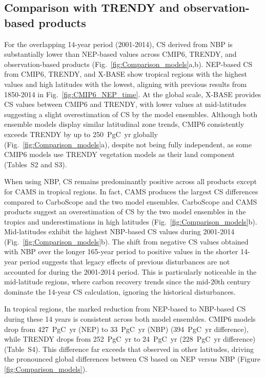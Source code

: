 \documentclass[9pt,twocolumn,twoside]{pnas-new}
\begin{document}
\subsection*{Comparison with TRENDY and observation-based products}
For the overlapping 14-year period (2001-2014), CS derived from NBP is substantially lower than NEP-based values across CMIP6, TRENDY, and observation-based products (Fig.~\ref{fig:Comparison_models}a,b). NEP-based CS from CMIP6, TRENDY, and X-BASE show tropical regions with the highest values and high latitudes with the lowest, aligning with previous results from 1850-2014 in Fig.~\ref{fig:CMIP6_NEP_time}. 
At the global scale, X-BASE provides CS values between CMIP6 and TRENDY, with lower values at mid-latitudes suggesting a slight overestimation of CS by the model ensembles. Although both ensemble models display similar latitudinal zone trends, CMIP6 consistently exceeds TRENDY by up to 250~PgC~yr globally (Fig.~\ref{fig:Comparison_models}a), despite not being fully independent, as some CMIP6 models use TRENDY vegetation models as their land component (Tables~S2 and S3).

When using NBP, CS remains predominantly positive across all products except for CAMS in tropical regions. In fact, CAMS produces the largest CS differences compared to CarboScope and the two model ensembles. CarboScope and CAMS products suggest an overestimation of CS by the two model ensembles in the tropics and underestimations in high latitudes (Fig.~\ref{fig:Comparison_models}b).
Mid-latitudes exhibit the highest NBP-based CS values during 2001-2014 (Fig.~\ref{fig:Comparison_models}b). The shift from negative CS values obtained with NBP over the longer 165-year period to positive values in the shorter 14-year period suggests that legacy effects of previous disturbances are not accounted for during the 2001-2014 period. This is particularly noticeable in the mid-latitude regions, where carbon recovery trends since the mid-20th century dominate the 14-year CS calculation, ignoring the historical disturbances. 

In tropical regions, the marked reduction from NEP-based to NBP-based CS during these 14 years is consistent across both model ensembles. CMIP6 models drop from 427~PgC~yr (NEP) to 33~PgC~yr (NBP) (394~PgC~yr difference), while TRENDY drops from 252~PgC~yr to 24~PgC~yr (228~PgC~yr difference) (Table~S4). This difference far exceeds that observed in other latitudes, driving the pronounced global differences between CS based on NEP versus NBP (Figure \ref{fig:Comparison_models}). 
\end{document}
